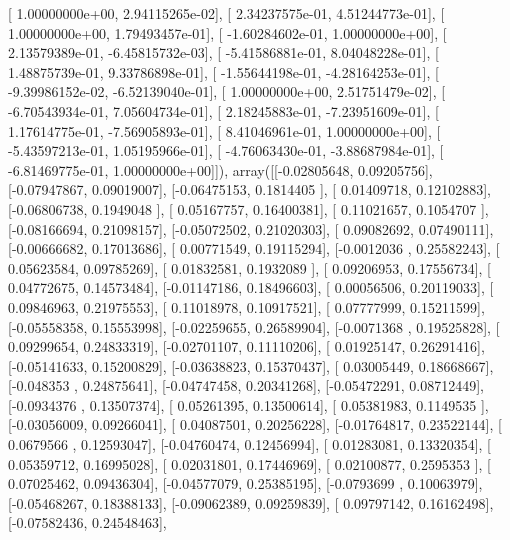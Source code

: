 \documentclass{article}
\begin{document}
       [  1.00000000e+00,   2.94115265e-02],
       [  2.34237575e-01,   4.51244773e-01],
       [  1.00000000e+00,   1.79493457e-01],
       [ -1.60284602e-01,   1.00000000e+00],
       [  2.13579389e-01,  -6.45815732e-03],
       [ -5.41586881e-01,   8.04048228e-01],
       [  1.48875739e-01,   9.33786898e-01],
       [ -1.55644198e-01,  -4.28164253e-01],
       [ -9.39986152e-02,  -6.52139040e-01],
       [  1.00000000e+00,   2.51751479e-02],
       [ -6.70543934e-01,   7.05604734e-01],
       [  2.18245883e-01,  -7.23951609e-01],
       [  1.17614775e-01,  -7.56905893e-01],
       [  8.41046961e-01,   1.00000000e+00],
       [ -5.43597213e-01,   1.05195966e-01],
       [ -4.76063430e-01,  -3.88687984e-01],
       [ -6.81469775e-01,   1.00000000e+00]]), array([[-0.02805648,  0.09205756],
       [-0.07947867,  0.09019007],
       [-0.06475153,  0.1814405 ],
       [ 0.01409718,  0.12102883],
       [-0.06806738,  0.1949048 ],
       [ 0.05167757,  0.16400381],
       [ 0.11021657,  0.1054707 ],
       [-0.08166694,  0.21098157],
       [-0.05072502,  0.21020303],
       [ 0.09082692,  0.07490111],
       [-0.00666682,  0.17013686],
       [ 0.00771549,  0.19115294],
       [-0.0012036 ,  0.25582243],
       [ 0.05623584,  0.09785269],
       [ 0.01832581,  0.1932089 ],
       [ 0.09206953,  0.17556734],
       [ 0.04772675,  0.14573484],
       [-0.01147186,  0.18496603],
       [ 0.00056506,  0.20119033],
       [ 0.09846963,  0.21975553],
       [ 0.11018978,  0.10917521],
       [ 0.07777999,  0.15211599],
       [-0.05558358,  0.15553998],
       [-0.02259655,  0.26589904],
       [-0.0071368 ,  0.19525828],
       [ 0.09299654,  0.24833319],
       [-0.02701107,  0.11110206],
       [ 0.01925147,  0.26291416],
       [-0.05141633,  0.15200829],
       [-0.03638823,  0.15370437],
       [ 0.03005449,  0.18668667],
       [-0.048353  ,  0.24875641],
       [-0.04747458,  0.20341268],
       [-0.05472291,  0.08712449],
       [-0.0934376 ,  0.13507374],
       [ 0.05261395,  0.13500614],
       [ 0.05381983,  0.1149535 ],
       [-0.03056009,  0.09266041],
       [ 0.04087501,  0.20256228],
       [-0.01764817,  0.23522144],
       [ 0.0679566 ,  0.12593047],
       [-0.04760474,  0.12456994],
       [ 0.01283081,  0.13320354],
       [ 0.05359712,  0.16995028],
       [ 0.02031801,  0.17446969],
       [ 0.02100877,  0.2595353 ],
       [ 0.07025462,  0.09436304],
       [-0.04577079,  0.25385195],
       [-0.0793699 ,  0.10063979],
       [-0.05468267,  0.18388133],
       [-0.09062389,  0.09259839],
       [ 0.09797142,  0.16162498],
       [-0.07582436,  0.24548463],
\end{document}
